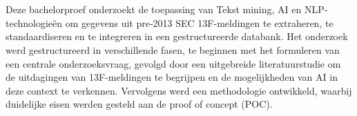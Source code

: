 
%
%
%
%
%

%



\chapter*{}


Deze bachelorproef onderzoekt de toepassing van Tekst mining, AI en NLP- technologieën om gegevens uit pre-2013 SEC 13F-meldingen te extraheren, te standaardiseren en te integreren in een gestructureerde databank. Het onderzoek werd gestructureerd in verschillende fasen, te beginnen met het formuleren van een centrale onderzoeksvraag, gevolgd door een uitgebreide literatuurstudie om de uitdagingen van 13F-meldingen te begrijpen en de mogelijkheden van AI in deze context te verkennen. Vervolgens werd een methodologie ontwikkeld, waarbij duidelijke eisen werden gesteld aan de proof of concept (POC).

